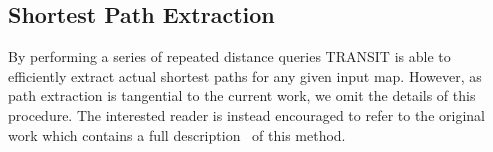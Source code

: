 \subsection{Shortest Path Extraction}
By performing a series of repeated distance queries TRANSIT is able to efficiently extract
actual shortest paths for any given input map. However, as path extraction is tangential to the 
current work, we omit the details of this procedure. The interested reader is instead encouraged 
to refer to the original work which contains a full description~\cite{bast06} of this method.
